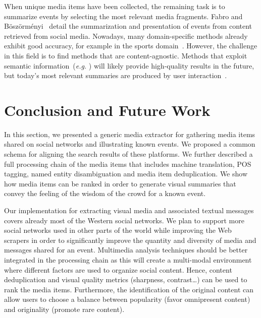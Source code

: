 When unique media items have been collected, the remaining task is to summarize events by selecting the most relevant media fragments. Fabro and B\"osz\"orm\'enyi~\cite{Fabro:MMM12} detail the summarization and presentation of events from content retrieved from social media. Nowadays, many domain-specific methods already exhibit good accuracy, for example in the sports domain~\cite{Li1,Li2}. However, the challenge in this field is to find methods that are content-agnostic. Methods that exploit semantic information~(\emph{e.g.} \cite{Chen}) will likely provide high-quality results in the future, but today's most relevant summaries are produced by user interaction~\cite{Olsen}.


\section{Conclusion and Future Work}                                        \label{sec:conclusion}
In this section, we presented a generic media extractor for gathering media items shared on social networks and illustrating known events. We proposed a common schema for aligning the search results of these platforms. We further described a full processing chain of the media items that includes machine translation, POS tagging, named entity disambiguation and media item deduplication. We show how media items can be ranked in order to generate visual summaries that convey the feeling of the wisdom of the crowd for a known event.

Our implementation for extracting visual media and associated textual messages covers already most of the Western social networks. We plan to support more social networks used in other parts of the world while improving the Web scrapers in order to significantly improve the quantity and diversity of media and messages shared for an event. Multimedia analysis techniques should be better integrated in the processing chain as this will create a multi-modal environment where different factors are used to organize social content. Hence, content deduplication and visual quality metrics (sharpness, contrast\ldots) can be used to rank the media items. Furthermore, the identification of the original content can allow users to choose a balance between popularity (favor omnipresent content) and originality (promote rare content).


